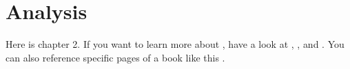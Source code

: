 \chapter{Analysis} \label{chap:analysis}
Here is chapter 2. If you want to learn more about \LaTeXe{}, have a look at \cite{measurer}, \cite{renostra}, \cite{scientifictheory} and \cite{rcf}. You can also reference specific pages of a book like this \cite[150--160]{physicbook}.
